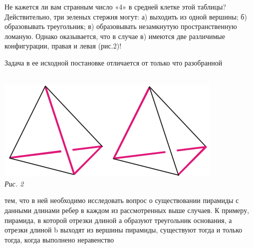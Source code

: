 {\begin{multicols}{3}
\begin{center}
\end{center}
Не кажется ли вам странным число «4» в средней клетке этой таблицы?
Действительно, три зеленых стержня могут: а) выходить из одной вершины;
б) образовывать треугольник; в) образовывать незамкнутую
пространственную ломаную. Однако оказывается, что в случае
в) имеются две различимые конфигурации, правая и левая (рис.2)! \par
Задача в ее исходной постановке отличается от только что разобранной \\ \\
\begin{minipage}{\linewidth}
\includegraphics[width=\linewidth]{images/picture2.png} \\
\textsl{Рис. 2} \\
\end{minipage}
тем, что в ней необходимо исследовать вопрос о существовании
пирамиды с данными длинами ребер в каждом из рассмотренных
выше случаев. К примеру, пирамида, в которой отрезки длиной
$а$ образуют треугольник основания, а отрезки длиной b выходят из
вершины пирамиды, существуют тогда и только тогда, когда
выполнено неравенство\\ 


\end{multicols}}
